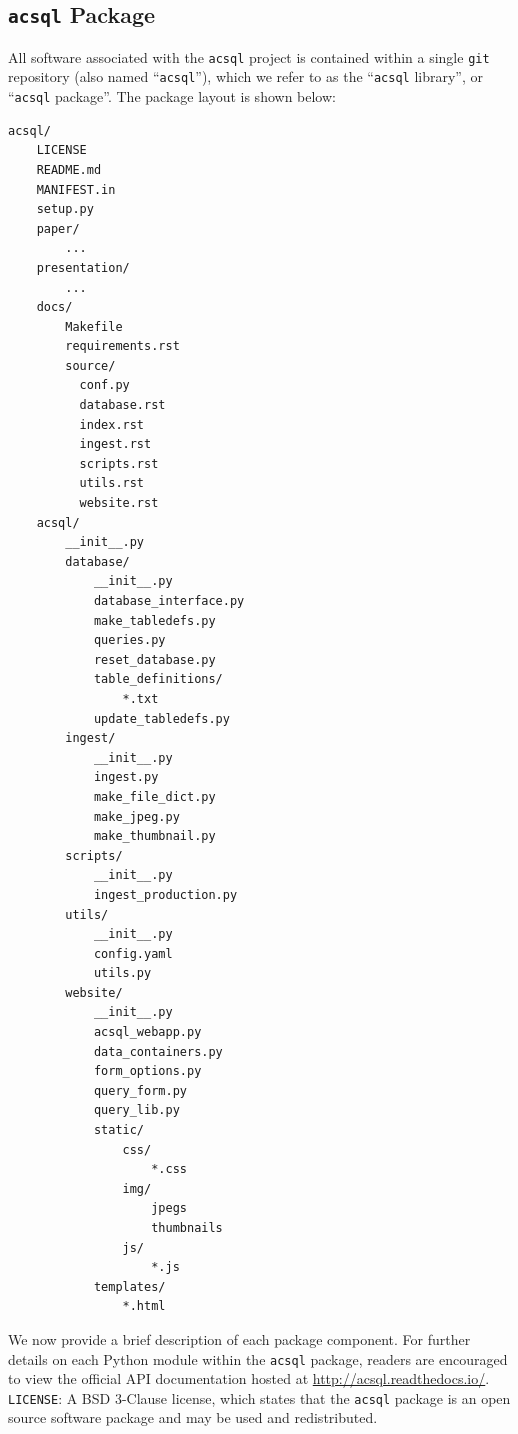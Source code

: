 \documentclass[10pt,journal,compsoc]{IEEEtran}
\begin{document}
\subsection{\texttt{acsql} Package} \label{sec3.10}

All software associated with the \texttt{acsql} project is contained within a single \texttt{git} repository (also named ``\texttt{acsql}''), which we refer to as the ``\texttt{acsql} library'',
or ``\texttt{acsql} package''.  The package layout is shown below:

\lstset{basicstyle=\footnotesize\ttfamily,breaklines=true}
\begin{lstlisting}
acsql/
    LICENSE
    README.md
    MANIFEST.in
    setup.py
    paper/
        ...
    presentation/
        ...
    docs/
        Makefile
        requirements.rst
        source/
          conf.py
          database.rst
          index.rst
          ingest.rst
          scripts.rst
          utils.rst
          website.rst
    acsql/
        __init__.py
        database/
            __init__.py
            database_interface.py
            make_tabledefs.py
            queries.py
            reset_database.py
            table_definitions/
                *.txt
            update_tabledefs.py
        ingest/
            __init__.py
            ingest.py
            make_file_dict.py
            make_jpeg.py
            make_thumbnail.py
        scripts/
            __init__.py
            ingest_production.py
        utils/
            __init__.py
            config.yaml
            utils.py
        website/
            __init__.py
            acsql_webapp.py
            data_containers.py
            form_options.py
            query_form.py
            query_lib.py
            static/
                css/
                    *.css
                img/
                    jpegs
                    thumbnails
                js/
                    *.js
            templates/
                *.html
\end{lstlisting}

We now provide a brief description of each package component.  For further details on each Python module within the \texttt{acsql} package, readers are encouraged to view the official API
documentation hosted at \textcolor{blue}{\url{http://acsql.readthedocs.io/}}.\\

\noindent\texttt{LICENSE}: A BSD 3-Clause license, which states that the \texttt{acsql} package is an open source software package and may be used and redistributed.\\
\end{document}
